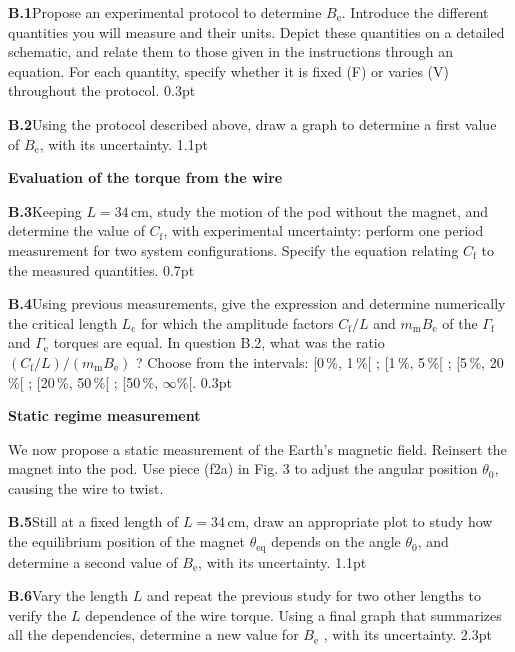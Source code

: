 \textbf{B.1}\quad Propose an experimental protocol to determine
$B_\mathrm{e}$. Introduce the different quantities you will measure and their
units. Depict these quantities on a detailed schematic, and relate them to
those given in the instructions through an equation. For each quantity, specify
whether it is fixed (F) or varies (V) throughout the protocol. \hfill 0.3pt

\textbf{B.2}\quad Using the protocol described above, draw a graph to determine
a first value of $B_\mathrm{e}$, with its uncertainty. \hfill 1.1pt

\textbf{Evaluation of the torque from the wire}

\textbf{B.3}\quad Keeping $L = 34\,\mathrm{cm}$, study the motion of the pod
without the magnet, and determine the value of $C_\mathrm{f}$, with
experimental uncertainty: perform one period measurement for two system
configurations. Specify the equation relating $C_\mathrm{f}$ to the measured
quantities. \hfill 0.7pt

\textbf{B.4}\quad Using previous measurements, give the expression and
determine numerically the critical length $L_\mathrm{c}$ for which the
amplitude factors $C_\mathrm{f}/L$ and $m_\mathrm{m}B_\mathrm{e}$ of the
$\varGamma_\mathrm{f}$ and $\varGamma_\mathrm{e}$ torques are equal. In
question B.2, what was the ratio $(C_\mathrm{f}/L)/(m_\mathrm{m}B_\mathrm{e})$
? Choose from the intervals: [0\,\%, 1\,\%[ ; [1\,\%, 5\,\%[ ; [5\,\%, 20\,\%[ ;
[20\,\%, 50\,\%[ ; [50\,\%, $\infty$\%[. \hfill 0.3pt

\textbf{Static regime measurement}

We now propose a static measurement of the Earth's magnetic field. Reinsert the
magnet into the pod. Use piece (f2a) in Fig. 3 to adjust the angular position
$\theta_0$, causing the wire to twist.

\textbf{B.5}\quad Still at a fixed length of $L = 34\,\mathrm{cm}$, draw an
appropriate plot to study how the equilibrium position of the magnet
$\theta_\mathrm{eq}$ depends on the angle $\theta_0$, and determine a second
value of $B_\mathrm{e}$, with its uncertainty. \hfill 1.1pt

\textbf{B.6}\quad Vary the length $L$ and repeat the previous study for two
other lengths to verify the $L$ dependence of the wire torque. Using a final
graph that summarizes all the dependencies, determine a new value for
$B_\mathrm{e}$ , with its uncertainty. \hfill 2.3pt
